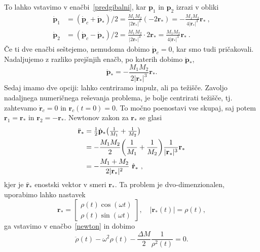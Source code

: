 \documentclass[12pt, a4paper]{article}
\renewcommand{\r}{
    \ensuremath{\mathbf{r}}
}
\newcommand{\p}{
    \ensuremath{\mathbf{p}}
}
\newcommand{\sfrac}[2]{
    \ensuremath{\textstyle{\frac{#1}{#2}}}
}
\newcommand{\w}{
    \ensuremath{\omega}
}
\begin{document}
To lahko vstavimo v ena\v cbi~\eqref{predgibalni}, kar $\p_1$ in $\p_2$ izrazi v obliki
\begin{align*}
    \dot{\p}_1 &= (\dot{\p}_c + \dot{\p}_*)/2 = \frac{M_1M_2}{|2\r_*|^3}(-2\r_*) = -\frac{M_1M_2}{4|\r_*|^3}\r_*\ , \\
    \dot{\p}_2 &= (\dot{\p}_c - \dot{\p}_*)/2 = \frac{M_1M_2}{|2\r_*|^3}\cdot 2\r_* = \frac{M_1M_2}{4|\r_*|^3}\r_*\ .
\end{align*}
\v Ce ti dve ena\v cbi se\v stejemo, nemudoma dobimo $\dot{\p}_c = 0$, kar smo tudi pri\v cakovali. Nadaljujemo z
razliko prej\v snjih ena\v cb, po katerih dobimo $\dot{\p}_*$,
\begin{equation*}
    \dot{\p}_* = - \frac{M_1M_2}{2|\r_*|^3}\r_*.
\end{equation*}
Sedaj imamo dve opciji: lahko centriramo impulz, ali pa te\v zi\v s\v ce. Zavoljo nadaljnega numeri\v cnega re\v sevanja
problema, je bolje centrirati te\v zi\v s\v ce, tj. zahtevamo $\dot{\r}_c = 0$ in $\r_c (t = 0) = 0$. To mo\v cno
poenostavi vse skupaj, saj potem $\r_1 = \r_*$ in $\r_2 = -\r_*$. Newtonov zakon za $\r_*$ se glasi
\begin{align}
    \ddot{\r}_* &= \sfrac{1}{2}\dot{\p}_*\big(\sfrac{1}{M_1} + \sfrac{1}{M_2}\big) \notag \\
                &= -\frac{M_1 M_2}{2}\bigg(\frac{1}{M_1} + \frac{1}{M_2}\bigg)\frac{1}{|\r_*|^3}\r_* \notag \\
                &= -\frac{M_1 + M_2}{2|\r_*|^2}\ \hat{\r}_*\ ,
    \label{newton}
\end{align}
kjer je $\hat{\r}_*$ enostski vektor v smeri $\r_*$. Ta problem je dvo-dimenzionalen, uporabimo lahko nastavek
\[
    \r_* = \begin{bmatrix} \rho(t) \cos(\w t) \\ \rho(t) \sin(\w t) \end{bmatrix}, \quad |\r_*(t)| = \rho(t),
\]
ga vstavimo v ena\v cbo~\eqref{newton} in dobimo
\[
    \ddot{\rho}(t) - \w^2\rho(t) - \frac{\Delta M}{2}\frac{1}{\rho^2(t)} = 0.
\]
\end{document}
